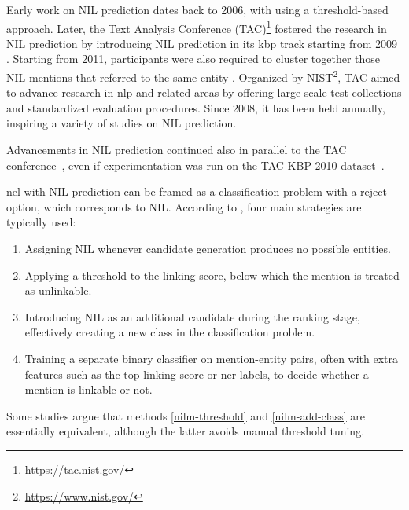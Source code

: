 Early work on NIL prediction dates back to 2006, with \textcite{bunescu-pasca-2006-using} using a threshold-based approach.
Later, the Text Analysis Conference (TAC)\footnote{\url{https://tac.nist.gov/}} fostered the research in NIL prediction by introducing NIL prediction in its \acf{kbp} track starting from 2009 \cite{mcnamee2009overview}. Starting from 2011, participants were also required to cluster together those NIL mentions that referred to the same entity \cite{ji2011tac}. Organized by NIST\footnote{\url{https://www.nist.gov/}}, TAC aimed to advance research in \ac{nlp} and related areas by offering large-scale test collections and standardized evaluation procedures. Since 2008, it has been held annually, inspiring a variety of studies on NIL prediction.

Advancements in NIL prediction continued also in parallel to the TAC conference~\cite{gottipati-jiang-2011-linking,hoffart_discovering_emergin_entities_2014,hoffart_awakens_2016,wu2016exploring}, even if \textcite{gottipati-jiang-2011-linking} experimentation was run on the TAC-KBP 2010 dataset~\cite{ji2010overview}. 




\ac{nel} with NIL prediction can be framed as a classification problem with a reject option, which corresponds to NIL. According to \textcite{Sevgili2022NeuralEL}, four main strategies are typically used:
\begin{enumerate}
\item Assigning NIL whenever candidate generation produces no possible entities.
\item Applying a threshold to the linking score, below which the mention is treated as unlinkable.
\item Introducing NIL as an additional candidate during the ranking stage, effectively creating a new class in the classification problem.
\item Training a separate binary classifier on mention-entity pairs, often with extra features such as the top linking score or \ac{ner} labels, to decide whether a mention is linkable or not.
\end{enumerate}

Some studies \cite{Zhang2012TheNE, Rao2013EntityLF} argue that methods \ref{nilm-threshold} and \ref{nilm-add-class} are essentially equivalent, although the latter avoids manual threshold tuning.

